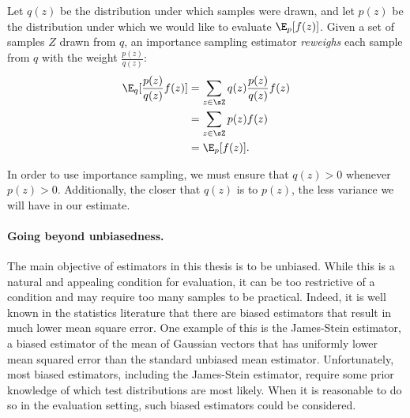 Let $q(z)$ be the distribution under which samples were drawn, and let $p(z)$ be the distribution under which we would like to evaluate $\E_p[f(z)]$.
Given a set of samples $Z$ drawn from $q$, an importance sampling estimator \textit{reweighs} each sample from $q$ with the weight $\frac{p(z)}{q(z)}$:
\begin{align}
  \E_q[\frac{p(z)}{q(z)} f(z)] 
  &= \sum_{z \in \sZ} q(z) \frac{p(z)}{q(z)} f(z) \\
  &= \sum_{z \in \sZ} p(z) f(z) \\
  &= \E_p[f(z)].
\end{align}

In order to use importance sampling, we must ensure that $q(z) > 0$ whenever $p(z) > 0$.
Additionally, the closer that $q(z)$ is to $p(z)$, the less variance we will have in our estimate.

\paragraph{Going beyond unbiasedness.}
The main objective of estimators in this thesis is to be unbiased.
While this is a natural and appealing condition for evaluation, it can be too restrictive of a condition and may require too many samples to be practical.
Indeed, it is well known in the statistics literature that there are biased estimators that result in much lower mean square error.
One example of this is the James-Stein estimator, a biased estimator of the mean of Gaussian vectors that has uniformly lower mean squared error than the standard unbiased mean estimator.
Unfortunately, most biased estimators, including the James-Stein estimator, require some prior knowledge of which test distributions are most likely.
When it is reasonable to do so in the evaluation setting, such biased estimators could be considered.
